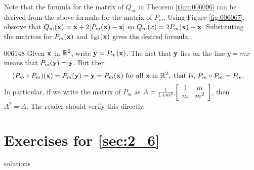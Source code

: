 Note that the formula for the matrix of $Q_{m}$ in Theorem \ref{thm:006096} can be derived from the above formula for the matrix of $P_m$. Using Figure \ref{fig:006067}, observe that $Q_{m}(\textbf{x}) = \textbf{x} + 2[P_{m}(\textbf{x}) - \textbf{x}]$ so $Q_{m}(x) = 2P_{m}(\textbf{x})-\textbf{x}$. Substituting the matrices for $P_{m}(\textbf{x})$ and $1_{\mathbb{R}^2}(\textbf{x})$ gives the desired formula. 

\begin{example}{}{006148}
Given $\textbf{x}$ in $\mathbb{R}^2$, write $\textbf{y} = P_{m}(\textbf{x})$. The fact that $\textbf{y}$ lies on the line $y = mx$ means that $P_{m}(\textbf{y}) = \textbf{y}$. But then
\begin{equation*}
(P_{m} \circ P_{m})(\textbf{x}) = P_{m}(\textbf{y}) = \textbf{y} = P_{m}(\textbf{x}) \mbox{ for all } \textbf{x} \mbox{ in } \mathbb{R}^2, \mbox{ that is, } P_{m} \circ P_{m} = P_{m}.
\end{equation*}
In particular, if we write the matrix of $P_{m}$ as $A = \tfrac{1}{1 + m^2} \left[ \begin{array}{cc}
1 & m \\
m & m^2
\end{array} \right]$, then $A^{2} = A$. The reader should verify this directly.
\end{example}

\section*{Exercises for \ref{sec:2_6}}

\begin{Filesave}{solutions}
\end{Filesave}

